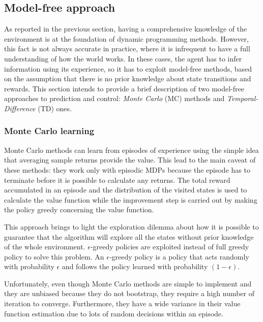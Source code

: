 \subsection{Model-free approach} \label{mfa}

As reported in the previous section, having a comprehensive knowledge of the environment is at the foundation of dynamic programming methods.
However, this fact is not always accurate in practice, where it is infrequent to have a full understanding of how the world works.
In these cases, the agent has to infer information using its experience, so it has to exploit model-free methods, based on the assumption that there is no prior knowledge about state transitions and rewards.
This section intends to provide a brief description of two model-free approaches to prediction and control: \textit{Monte Carlo} (MC) methods and \textit{Temporal-Difference} (TD) ones.

\subsubsection{Monte Carlo learning}

Monte Carlo methods \cite[Chapter 6]{sutton2018reinforcement} can learn from episodes of experience using the simple idea that averaging sample returns provide the value.
This lead to the main caveat of these methods: they work only with episodic MDPs because the episode has to terminate before it is possible to calculate any returns.
The total reward accumulated in an episode and the distribution of the visited states is used to calculate the value function while the improvement step is carried out by making the policy greedy concerning the value function.

This approach brings to light the exploration dilemma about how it is possible to guarantee that the algorithm will explore all the states without prior knowledge of the whole environment.
$\epsilon$-greedy policies are exploited instead of full greedy policy to solve this problem.
An $\epsilon$-greedy policy is a policy that acts randomly with probability $\epsilon$ and follows the policy learned with probability $(1-\epsilon)$.

Unfortunately, even though Monte Carlo methods are simple to implement and they are unbiased because they do not bootstrap, they require a high number of iteration to converge.
Furthermore, they have a wide variance in their value function estimation due to lots of random decisions within an episode.

